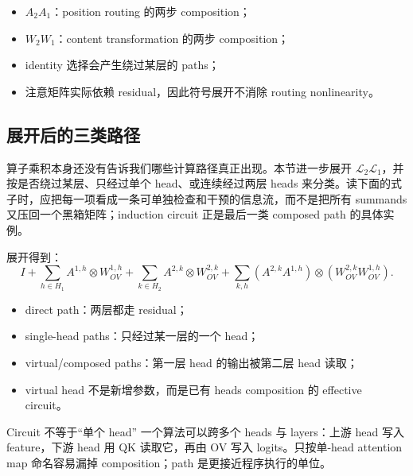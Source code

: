 \begin{itemize}
  \item $A_2A_1$：position routing 的两步 composition；
  \item $W_2W_1$：content transformation 的两步 composition；
  \item identity 选择会产生绕过某层的 paths；
  \item 注意矩阵实际依赖 residual，因此符号展开不消除 routing nonlinearity。
\end{itemize}


\subsection{展开后的三类路径}

算子乘积本身还没有告诉我们哪些计算路径真正出现。本节进一步展开 $\mathcal{L}_2\mathcal{L}_1$，并按是否绕过某层、只经过单个 head、或连续经过两层 heads 来分类。读下面的式子时，应把每一项看成一条可单独检查和干预的信息流，而不是把所有 summands 又压回一个黑箱矩阵；induction circuit 正是最后一类 composed path 的具体实例。

展开得到：
\[
I
+\sum_{h\in H_1}A^{1,h}\otimes W_{OV}^{1,h}
+\sum_{k\in H_2}A^{2,k}\otimes W_{OV}^{2,k}
+\sum_{k,h}(A^{2,k}A^{1,h})\otimes
(W_{OV}^{2,k}W_{OV}^{1,h}).
\]

\begin{itemize}
  \item direct path：两层都走 residual；
  \item single-head paths：只经过某一层的一个 head；
  \item virtual/composed paths：第一层 head 的输出被第二层 head 读取；
  \item virtual head 不是新增参数，而是已有 heads composition 的 effective circuit。
\end{itemize}



\begin{importantbox}{Circuit 不等于“单个 head”}
一个算法可以跨多个 heads 与 layers：上游 head 写入 feature，下游 head 用 QK 读取它，再由 OV 写入 logits。只按单-head attention map 命名容易漏掉 composition；path 是更接近程序执行的单位。
\end{importantbox}

